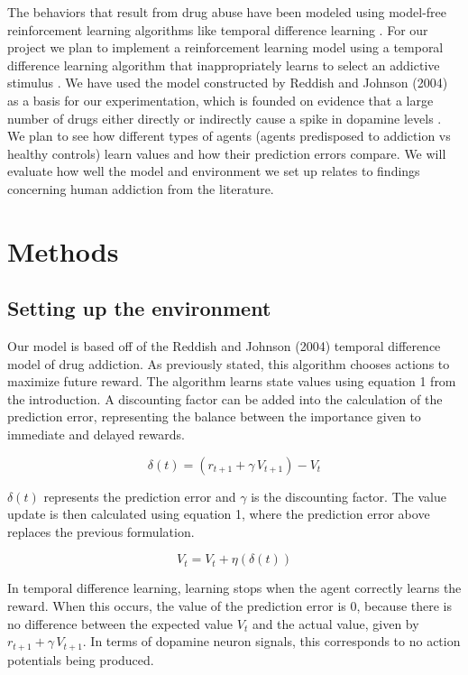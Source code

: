 \documentclass[10pt,letterpaper]{article}
\begin{document}
The behaviors that result from drug abuse have been modeled using model-free reinforcement learning algorithms like temporal difference learning \cite{ReddishJohnson2004, ReddishJensenJohnson2008, SimonDaw2012}. For our project we plan to implement a reinforcement learning model using a temporal difference learning algorithm that inappropriately learns to select an addictive stimulus \cite{ReddishJensenJohnson2008}. We have used the model constructed by Reddish and Johnson (2004) as a basis for our experimentation, which is founded on evidence that a large number of drugs either directly or indirectly cause a spike in dopamine levels \cite{Laviolette2004,Ritz1987, ReddishJohnson2004,ReddishJensenJohnson2008, Piccato1998, Pidoplichko1997}.
We plan to see how different types of agents (agents predisposed to addiction vs healthy controls) learn values and how their prediction errors compare. We will evaluate how well the model and environment we set up relates to findings concerning human addiction from the literature.


\section{Methods}
\subsection{Setting up the environment}
Our model is based off of the Reddish and Johnson (2004) temporal difference model of drug addiction. As previously stated, this algorithm chooses actions to maximize future reward. The algorithm learns state values using equation 1 from the introduction. A discounting factor can be added into the calculation of the prediction error, representing the balance between the importance given to immediate and delayed rewards.

\begin{equation}
\delta(t) = (r_{t+1} + \gamma\, V_{t+1}) - V_t
\end{equation}

$\delta(t)$ represents the prediction error and $\gamma$ is the discounting factor. The value update is then calculated using equation 1, where the prediction error above replaces the previous formulation.

\begin{equation}
V_t = V_t + \eta(\delta(t))
\end{equation}

In temporal difference learning, learning stops when the agent correctly learns the reward. When this occurs, the value of the prediction error is 0, because there is no difference between the expected value $V_t$ and the actual value, given by $r_{t+1} + \gamma\, V_{t+1}$. In terms of dopamine neuron signals, this corresponds to no action potentials being produced.
\end{document}
